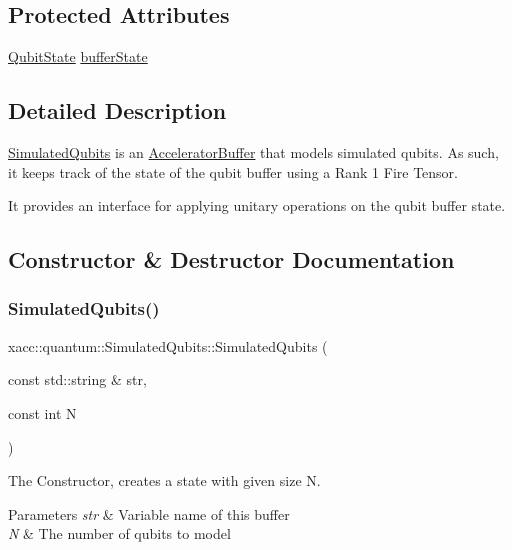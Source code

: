 \subsection*{Protected Attributes}
\begin{DoxyCompactItemize}
\item 
\hyperlink{a01347}{Qubit\+State} \hyperlink{a01247_a630bea50ee06fd59f74450f01f95e489}{buffer\+State}
\end{DoxyCompactItemize}


\subsection{Detailed Description}
\hyperlink{a01247}{Simulated\+Qubits} is an \hyperlink{a01447}{Accelerator\+Buffer} that models simulated qubits. As such, it keeps track of the state of the qubit buffer using a Rank 1 Fire Tensor.

It provides an interface for applying unitary operations on the qubit buffer state. 

\subsection{Constructor \& Destructor Documentation}
\mbox{\label{a01247_abb0419229628210a1c187b76be6edc30}} 
\subsubsection{\texorpdfstring{Simulated\+Qubits()}{SimulatedQubits()}\hspace{0.1cm}{\footnotesize\ttfamily [1/2]}}
{\footnotesize\ttfamily xacc\+::quantum\+::\+Simulated\+Qubits\+::\+Simulated\+Qubits (\begin{DoxyParamCaption}\item[{const std\+::string \&}]{str,  }\item[{const int}]{N }\end{DoxyParamCaption})\hspace{0.3cm}{\ttfamily [inline]}}

The Constructor, creates a state with given size N. 
\begin{DoxyParams}{Parameters}
{\em str} & Variable name of this buffer \\
\hline
{\em N} & The number of qubits to model \\
\hline
\end{DoxyParams}
\mbox{\label{a01247_a812afe5bad306acfe2b46e05098040a4}} 
